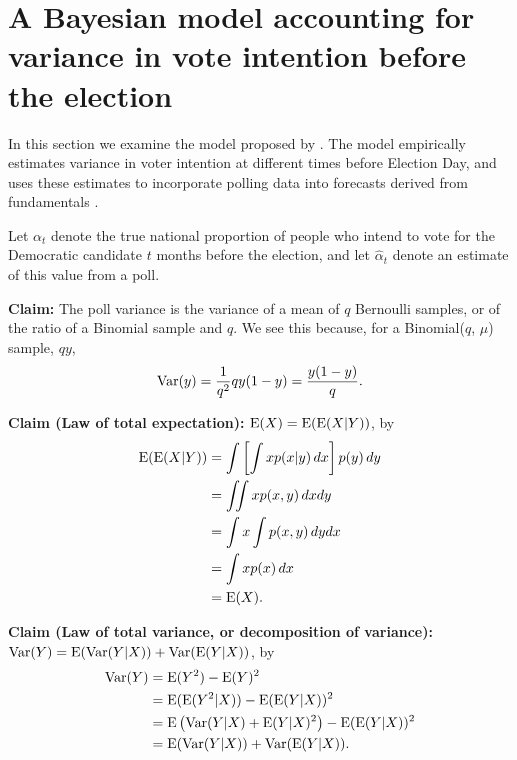 \documentclass[thesis.tex]{subfiles}
\begin{document}
\section{A Bayesian model accounting for variance in vote intention before the election}

In this section we examine the model proposed by \cite{Lock:2010aa}. The model empirically estimates variance in voter intention at different times before Election Day, and uses these estimates to incorporate polling data into forecasts derived from fundamentals \citep{Hibbs:2008aa}.

Let \(\alpha_t\) denote the true national proportion of people who intend to vote for the Democratic candidate \(t\) months before the election, and let \(\widehat{\alpha}_t\) denote an estimate of this value from a poll.

\bigskip

\noindent\textbf{Claim:} The poll variance is the variance of a mean of \(q\) Bernoulli samples, or of the ratio of a Binomial sample and \(q\). We see this because, for a Binomial(\(q\), \(\mu\)) sample, \(qy\), \begin{equation}\begin{aligned}
	\operatorname{Var}(y) = \frac{1}{q^2}qy(1-y) = \frac{y(1-y)}{q}.
\end{aligned}\end{equation}

\bigskip

\noindent\textbf{Claim (Law of total expectation):} \(\operatorname{E} (X) = \operatorname{E}(\operatorname{E}(X | Y))\), by\begin{equation}
\begin{aligned}
	\operatorname{E}(\operatorname{E}(X | Y)) &= \int \left[\int x p(x | y)\, dx\right] p(y)\, dy \\
	&= \iint x p(x, y)\, dx dy \\
	&= \int x \int p(x, y)\, dy dx \\
	&= \int x p(x) \, dx \\
	&= \operatorname{E}(X).
\end{aligned}
\end{equation}

\bigskip

\noindent\textbf{Claim (Law of total variance, or decomposition of variance):} \(\operatorname{Var}(Y) = \operatorname{E}(\operatorname{Var}(Y | X)) + \operatorname{Var}(\operatorname{E}(Y | X))\), by \begin{equation}
\begin{aligned}
	\operatorname{Var}(Y) &= \operatorname{E}(Y^2) - \operatorname{E}(Y)^2 \\
	&= \operatorname{E}(\operatorname{E}(Y^2 | X)) - \operatorname{E}(\operatorname{E}(Y | X))^2 \\
	&= \operatorname{E}\left(\operatorname{Var}(Y|X) + \operatorname{E}(Y | X)^2\right) - \operatorname{E}(\operatorname{E}(Y | X))^2 \\
	&= \operatorname{E}(\operatorname{Var}(Y | X)) + \operatorname{Var}(\operatorname{E}(Y | X)).
\end{aligned}
\end{equation}
\end{document}
